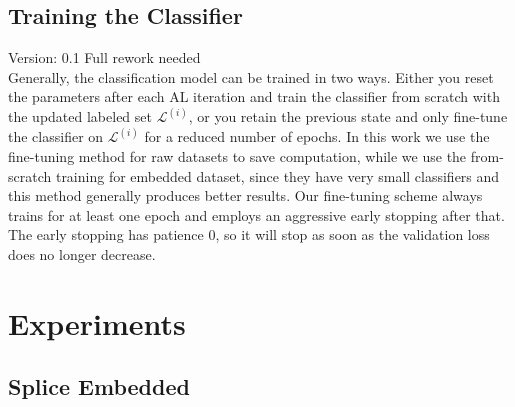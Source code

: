 \documentclass[]{article}
\begin{document}
\subsection{Training the Classifier}\label{sec:training_the_classifier}
{\color{red} Version: 0.1 Full rework needed}\\
Generally, the classification model can be trained in two ways. Either you reset the parameters after each AL iteration and train the classifier from scratch with the updated labeled set $\mathcal{L}^{(i)}$, or you retain the previous state and only fine-tune the classifier on $\mathcal{L}^{(i)}$ for a reduced number of epochs.
In this work we use the fine-tuning method for raw datasets to save computation, while we use the from-scratch training for embedded dataset, since they have very small classifiers and this method generally produces better results.
Our fine-tuning scheme always trains for at least one epoch and employs an aggressive early stopping after that.
The early stopping has patience 0, so it will stop as soon as the validation loss does no longer decrease.

\section{Experiments}

\subsection{Splice Embedded}
\end{document}
